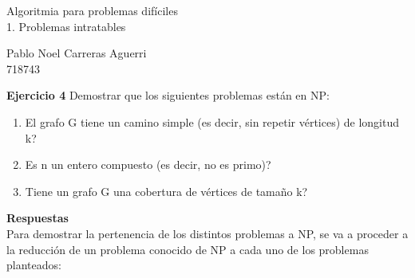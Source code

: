 \documentclass[10pt]{article}
\begin{document}

\Large
 \begin{center}
Algoritmia para problemas difíciles\\ 
\small  
1. Problemas intratables\\

\hspace{10pt}

\large
Pablo Noel Carreras Aguerri\\
\small
718743\\

\end{center}

\normalsize

\vspace{10mm}

\noindent
\textbf{Ejercicio 4} Demostrar que los siguientes problemas están en NP:

\begin{enumerate}
	\item El grafo G tiene un camino simple (es decir, sin repetir vértices) de longitud k?
	\item Es n un entero compuesto (es decir, no es primo)?
	\item Tiene un grafo G una cobertura de vértices de tamaño k?
\end{enumerate}

\vspace{10mm}

\noindent
\textbf{Respuestas}\\

Para demostrar la pertenencia de los distintos problemas a NP, se va a proceder a la reducción de un problema conocido de NP a cada uno de los problemas planteados:
\end{document}
